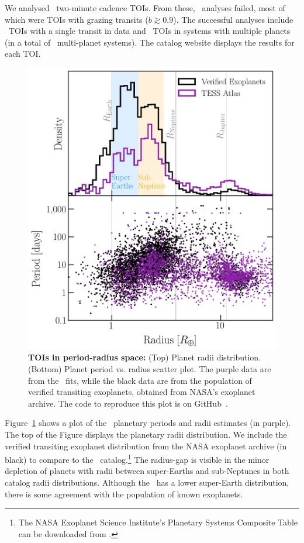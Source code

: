 \documentclass[floatfix,ApJL,twocolumn]{aastex631}
\begin{document}
We analysed \numAnalysed\ two-minute cadence TOIs.
From these, \failPercent\ analyses failed, most of which were TOIs with grazing transits ($b\gtrsim0.9$).
The successful analyses include \numAnalysedSingle\ TOIs with a single transit in data and \numAnalysedMulti\ TOIs in systems with multiple planets (in a total of \numMultiSystems\ multi-planet systems).
The catalog website displays the results for each TOI.

\begin{figure}
  \includegraphics[width=\linewidth]{figures/radius_period_plot.png}
  \caption{\textbf{TOIs in period-radius space:}
    (Top) Planet radii distribution. (Bottom) Planet period vs. radius scatter plot.
    The purple data are from the \tessAtlas\ fits, while the black data are from the population of verified transiting exoplanets, obtained from NASA's exoplanet archive.
    The code to reproduce this plot is on GitHub~\paperPlotsLink.
  }
  \label{fig:radiusHist}
\end{figure}


Figure~\ref{fig:radiusHist} shows a plot of the \tessAtlas\ planetary periods and radii estimates (in purple).
The top of the Figure displays the planetary radii distribution.
We include the verified transiting exoplanet distribution from the NASA exoplanet archive (in black) to compare to the \tessAtlas\ catalog.\footnote{The NASA Exoplanet Science Institute's Planetary Systems Composite Table can be downloaded from \confirmedPlanetsDb.}
The \citet{Fulton:2017:AJ} radius-gap is visible in the minor depletion of planets with radii between super-Earths and sub-Neptunes in both catalog radii distributions.
Although the \tessAtlas\ has a lower super-Earth distribution, there is some agreement with the population of known exoplanets.
\end{document}
